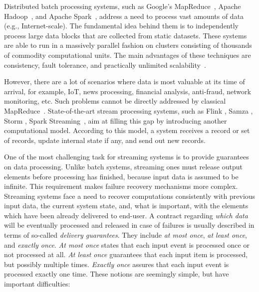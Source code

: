 
\label {fs-intro-seciton}

Distributed batch processing systems, such as Google's MapReduce~\cite{Dean:2008:MSD:1327452.1327492}, Apache Hadoop~\cite{hadoop2009hadoop}, and Apache Spark~\cite{Zaharia:2016:ASU:3013530.2934664}, address a need to process vast amounts of data (e.g., Internet-scale). The fundamental idea behind them is to independently process large data blocks that are collected from static datasets. These systems are able to run in a massively parallel fashion on clusters consisting of thousands of commodity computational units. The main advantages of these techniques are consistency, fault tolerance, and practically unlimited scalability~\cite{borthakur2011apache}.

However, there are a lot of scenarios where data is most valuable at its time of arrival, for example, IoT, news processing, financial analysis, anti-fraud, network monitoring, etc. Such problems cannot be directly addressed by classical MapReduce~\cite{Doulkeridis:2014:SLA:2628707.2628782}. State-of-the-art stream processing systems, such as Flink \cite{carbone2015apache}, Samza \cite{Noghabi:2017:SSS:3137765.3137770}, Storm \cite{apache:storm}, Spark Streaming~\cite{Zaharia:2012:DSE:2342763.2342773}, aim at filling this gap by introducing another computational model. According to this model, a system receives a record or set of records, update internal state if any, and send out new records. 

One of the most challenging task for streaming systems is to provide guarantees on data processing. Unlike batch systems, streaming ones must release output elements before processing has finished, because input data is assumed to be infinite. This requirement makes failure recovery mechanisms more complex. Streaming systems face a need to recover computations consistently with previous input data, the current system state, and, what is important, with the elements which have been already delivered to end-user. A contract regarding {\em which data} will be eventually processed and released in case of failures is usually described in terms of so-called {\em delivery guarantees}. They include {\em at most once}, {\em at least once}, and {\em exactly once}. {\it At most once} states that each input event is processed once or not processed at all. {\it At least once} guarantees that each input item is processed, but possibly multiple times. {\it Exactly once} assures that each input event is processed exactly one time. These notions are seemingly simple, but have important difficulties:

